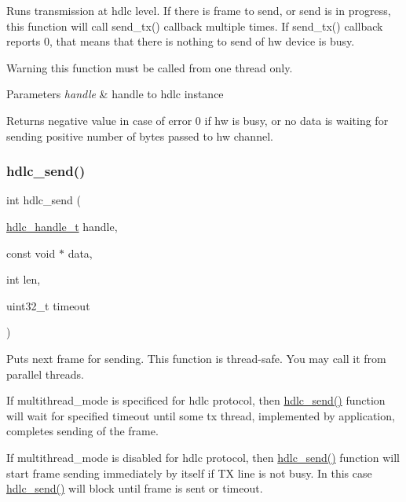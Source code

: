 Runs transmission at hdlc level. If there is frame to send, or send is in progress, this function will call send\+\_\+tx() callback multiple times. If send\+\_\+tx() callback reports 0, that means that there is nothing to send of hw device is busy. \begin{DoxyWarning}{Warning}
this function must be called from one thread only.
\end{DoxyWarning}

\begin{DoxyParams}{Parameters}
{\em handle} & handle to hdlc instance \\
\hline
\end{DoxyParams}
\begin{DoxyReturn}{Returns}
negative value in case of error 0 if hw is busy, or no data is waiting for sending positive number of bytes passed to hw channel. 
\end{DoxyReturn}
\mbox{\label{group__HDLC__API_ga8b5cc456927145cebd82b2b560a6fa10}} 
\subsubsection{\texorpdfstring{hdlc\+\_\+send()}{hdlc\_send()}}
{\footnotesize\ttfamily int hdlc\+\_\+send (\begin{DoxyParamCaption}\item[{\hyperlink{struct__hdlc__handle__t}{hdlc\+\_\+handle\+\_\+t}}]{handle,  }\item[{const void $\ast$}]{data,  }\item[{int}]{len,  }\item[{uint32\+\_\+t}]{timeout }\end{DoxyParamCaption})}

Puts next frame for sending. This function is thread-\/safe. You may call it from parallel threads.

If multithread\+\_\+mode is specificed for hdlc protocol, then \hyperlink{group__HDLC__API_ga8b5cc456927145cebd82b2b560a6fa10}{hdlc\+\_\+send()} function will wait for specified timeout until some tx thread, implemented by application, completes sending of the frame.

If multithread\+\_\+mode is disabled for hdlc protocol, then \hyperlink{group__HDLC__API_ga8b5cc456927145cebd82b2b560a6fa10}{hdlc\+\_\+send()} function will start frame sending immediately by itself if TX line is not busy. In this case \hyperlink{group__HDLC__API_ga8b5cc456927145cebd82b2b560a6fa10}{hdlc\+\_\+send()} will block until frame is sent or timeout.

